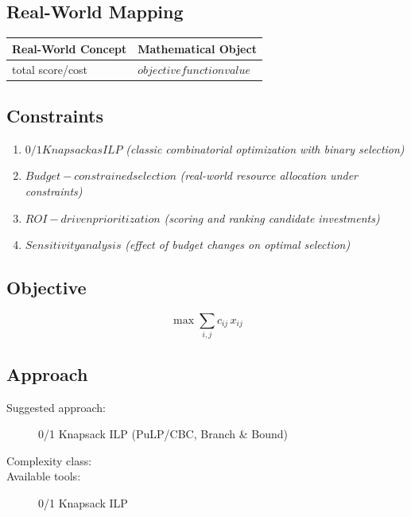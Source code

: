 \documentclass[11pt, a4paper]{article}
\begin{document}
\subsection{Real-World Mapping}

\begin{longtable}{ll}
\toprule
\textbf{Real-World Concept} & \textbf{Mathematical Object} \\
\midrule
\endhead
total score/cost & $objective function value$ \\
\bottomrule
\end{longtable}

\subsection{Constraints}

\begin{enumerate}
  \item $0/1 Knapsack as ILP$
  \hfill \textit{(classic combinatorial optimization with binary selection)}
  \item $Budget-constrained selection$
  \hfill \textit{(real-world resource allocation under constraints)}
  \item $ROI-driven prioritization$
  \hfill \textit{(scoring and ranking candidate investments)}
  \item $Sensitivity analysis$
  \hfill \textit{(effect of budget changes on optimal selection)}
\end{enumerate}

\subsection{Objective}

\begin{equation}
\max \sum_{i,j} c_{ij} \, x_{ij}
\end{equation}

\subsection{Approach}

\begin{description}
  \item[Suggested approach:] 0/1 Knapsack ILP (PuLP/CBC, Branch \& Bound)
  \item[Complexity class:] 
  \item[Available tools:] 0/1 Knapsack ILP
\end{description}
\end{document}
